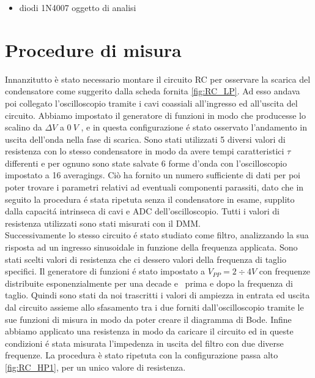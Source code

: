\documentclass{article}
\begin{document}
\begin{itemize}
  \item diodi 1N4007 oggetto di analisi
  
\end{itemize}

\newpage

\section{Procedure di misura}

Innanzitutto è stato necessario montare il circuito RC per osservare la scarica del condensatore come suggerito dalla scheda fornita \ref{fig:RC_LP}. Ad esso andava poi collegato l'oscilloscopio tramite i cavi coassiali all'ingresso ed all'uscita del circuito. Abbiamo impostato il generatore di funzioni in modo che  producesse lo scalino da $\Delta V$ a $0\ V$ , e in questa configurazione \'e stato osservato l'andamento in uscita dell'onda nella fase di scarica. Sono stati utilizzati 5 diversi valori di resistenza con lo stesso condensatore in modo da avere tempi caratteristici $\tau$ differenti e per ognuno sono state salvate 6 forme d'onda con l'oscilloscopio impostato a 16 averagings. Ciò ha fornito un numero sufficiente di dati per poi poter trovare i parametri relativi ad eventuali componenti parassiti, dato che in seguito la procedura \'e stata ripetuta senza il condensatore in esame, supplito dalla capacit\'a intrinseca di cavi e ADC dell'oscilloscopio. Tutti i valori di resistenza utilizzati sono stati misurati con il DMM. \\

Successivamente lo stesso circuito \'e stato studiato come filtro, analizzando la sua risposta ad un ingresso sinusoidale in funzione della frequenza applicata. Sono stati scelti valori di resistenza che ci dessero valori della frequenza di taglio specifici. Il generatore di funzioni \'e stato impostato a $V_{PP} = 2\div 4 V$ con frequenze distribuite esponenzialmente per una decade e \textonehalf \ prima e dopo la frequenza di taglio. Quindi sono stati da noi trascritti i valori di ampiezza in entrata ed uscita dal circuito assieme allo sfasamento tra i due forniti dall'oscilloscopio tramite le sue funzioni di misura in modo da poter creare il diagramma di Bode. Infine abbiamo applicato una resistenza in modo da caricare il circuito ed in queste condizioni \'e stata misurata l'impedenza in uscita del filtro con due diverse frequenze. La procedura è stato ripetuta con la configurazione passa alto \ref{fig:RC_HP1}, per un unico valore di resistenza. \\
\end{document}

